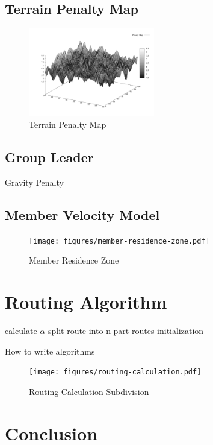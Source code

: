 \documentclass[journal]{IEEEtran}
\begin{document}
\subsection{Terrain Penalty Map}

\begin{figure}
    \centering
    \includegraphics[width=0.49\textwidth]{figures/penalty-map-3d.pdf}
    \caption{Terrain Penalty Map}%
    \label{fig:terrain-penalty-map}
\end{figure}

\subsection{Group Leader}

Gravity Penalty

\subsection{Member Velocity Model}

\begin{figure}
    \centering
    \texttt{[image: figures/member-residence-zone.pdf]}
    \caption{Member Residence Zone}%
    \label{fig:member:residence:zone}
\end{figure}

\section{Routing Algorithm}

\begin{algorithm}[H]
  \SetLine
	calculate $\alpha$
	split route into n part routes 
  initialization\;
  \caption{How to write algorithms}
\end{algorithm}

\begin{figure}
    \centering
    \texttt{[image: figures/routing-calculation.pdf]}
    \caption{Routing Calculation Subdivision}%
    \label{fig:routing:calculation:subdivision}
\end{figure}

\section{Conclusion}


\nocite{*}


\end{document}
